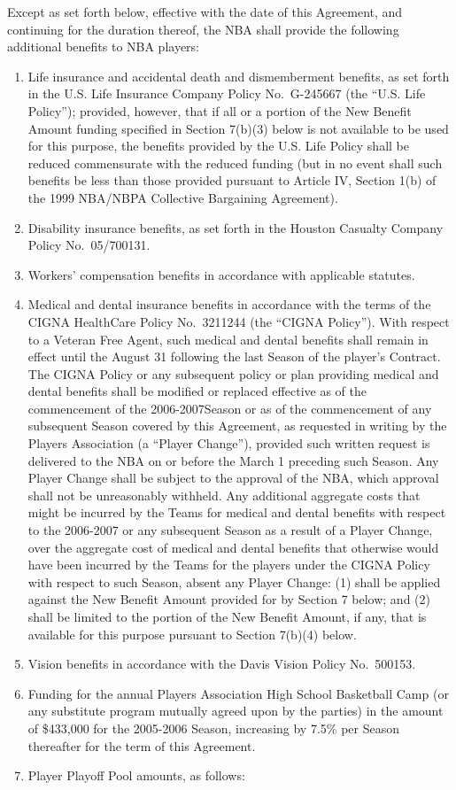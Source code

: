 \documentclass[
]{book}
\begin{document}
Except as set forth below, effective with the date of this Agreement, and continuing for the duration thereof, the NBA shall provide the following additional benefits to NBA players:

\begin{enumerate}
\def\labelenumi{(\alph{enumi})}
\item
  Life insurance and accidental death and dismemberment benefits, as set forth in the U.S. Life Insurance Company Policy No.~G-245667 (the ``U.S. Life Policy''); provided, however, that if all or a portion of the New Benefit Amount funding specified in Section 7(b)(3) below is not available to be used for this purpose, the benefits provided by the U.S. Life Policy shall be reduced commensurate with the reduced funding (but in no event shall such benefits be less than those provided pursuant to Article IV, Section 1(b) of the 1999 NBA/NBPA Collective Bargaining Agreement).
\item
  Disability insurance benefits, as set forth in the Houston Casualty Company Policy No.~05/700131.
\item
  Workers' compensation benefits in accordance with applicable statutes.
\item
  Medical and dental insurance benefits in accordance with the terms of the CIGNA HealthCare Policy No.~3211244 (the ``CIGNA Policy''). With respect to a Veteran Free Agent, such medical and dental benefits shall remain in effect until the August 31 following the last Season of the player's Contract.
  The CIGNA Policy or any subsequent policy or plan providing medical and dental benefits shall be modified or replaced effective as of the commencement of the 2006-2007Season or as of the commencement of any subsequent Season covered by this Agreement, as requested in writing by the Players Association (a ``Player Change''), provided such written request is delivered to the NBA on or before the March 1 preceding such Season. Any Player Change shall be subject to the approval of the NBA, which approval shall not be unreasonably withheld. Any additional aggregate costs that might be incurred by the Teams for medical and dental benefits with respect to the 2006-2007 or any subsequent Season as a result of a Player Change, over the aggregate cost of medical and dental benefits that otherwise would have been incurred by the Teams for the players under the CIGNA Policy with respect to such Season, absent any Player Change: (1) shall be applied against the New Benefit Amount provided for by Section 7 below; and (2) shall be limited to the portion of the New Benefit Amount, if any, that is available for this purpose pursuant to Section 7(b)(4) below.
\item
  Vision benefits in accordance with the Davis Vision Policy No.~500153.
\item
  Funding for the annual Players Association High School Basketball Camp (or any substitute program mutually agreed upon by the parties) in the amount of \$433,000 for the 2005-2006 Season, increasing by 7.5\% per Season thereafter for the term of this Agreement.
\item
  Player Playoff Pool amounts, as follows:


\end{enumerate}
\end{document}
